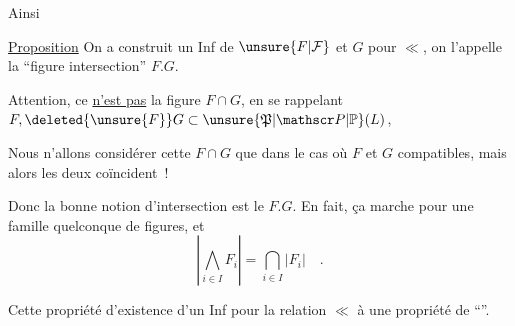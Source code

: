 
Ainsi

\uline{Proposition} On a construit un Inf de $\unsure{F|\mathcal F}$ et $G$ pour $\ll$, on l'appelle la ``figure intersection'' $F.G$.

Attention, ce \uline{n'est pas}  la figure $F\cap G$,  en se rappelant $F,\deleted{\unsure{F}}G\subset\unsure{\mathfrak P|\mathscr P|\mathbb P}(L)$, 

Nous n'allons considérer cette $F\cap G$ que dans le cas où $F$ et $G$ compatibles, mais alors les deux coïncident~!

Donc la bonne notion d'intersection est le $F.G$. En fait, ça marche pour une famille quelconque de figures, et
\[
 \left|\bigwedge_{i\in I} F_i\right|=\bigcap_{i\in I}|F_i|\quad .
\]

Cette propriété d'existence d'un Inf pour la relation $\ll$   à une propriété de ``\uline{}''.


